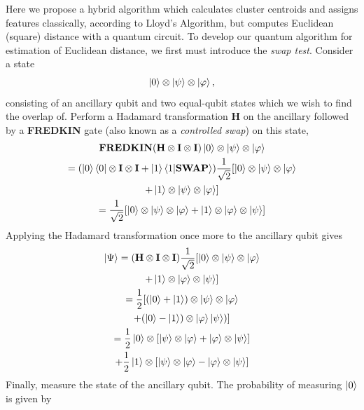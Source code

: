 \documentclass[twocolumn, english]{revtex4-2}
\begin{document}
Here we propose a hybrid algorithm which calculates cluster centroids and assigns features classically, according to Lloyd's Algorithm, but computes Euclidean (square) distance with a quantum circuit. To develop our quantum algorithm for estimation of Euclidean distance, we first must introduce the \textit{swap test}. Consider a state \begin{equation}\ket{0}\otimes\ket{\psi}\otimes\ket{\varphi},\end{equation} consisting of an ancillary qubit and two equal-qubit states which we wish to find the overlap of. Perform a Hadamard transformation \textbf{H} on the ancillary followed by a \textbf{FREDKIN} gate (also known as a \textit{controlled swap}) on this state, \begin{equation}\begin{gathered}
\textbf{FREDKIN}(\textbf{H}\otimes\textbf{I}\otimes\textbf{I})\ket{0}\otimes\ket{\psi}\otimes\ket{\varphi}\\
=(\ket{0}\bra{0}\otimes\textbf{I}\otimes\textbf{I}+\ket{1}\braket{1|\textbf{SWAP}})\frac{1}{\sqrt{2}}[\ket{0}\otimes\ket{\psi}\otimes\ket{\varphi}\\+\ket{1}\otimes\ket{\psi}\otimes\ket{\varphi}]\\
=\frac{1}{\sqrt{2}}[\ket{0}\otimes\ket{\psi}\otimes\ket{\varphi}+\ket{1}\otimes\ket{\varphi}\otimes\ket{\psi}]\end{gathered}\end{equation}
Applying the Hadamard transformation once more to the ancillary qubit gives
\begin{equation}\begin{gathered}
\ket{\Psi}=(\textbf{H}\otimes\textbf{I}\otimes\textbf{I})\frac{1}{\sqrt{2}}[\ket{0}\otimes\ket{\psi}\otimes\ket{\varphi}\\+\ket{1}\otimes\ket{\varphi}\otimes\ket{\psi}]\\
=\frac{1}{2}[(\ket{0}+\ket{1})\otimes\ket{\psi}\otimes\ket{\varphi}\\+(\ket{0}-\ket{1})\otimes\ket{\varphi}\ket{\psi})]\\
=\frac{1}{2}\ket{0}\otimes[\ket{\psi}\otimes\ket{\varphi}+\ket{\varphi}\otimes\ket{\psi}]\\+\frac{1}{2}\ket{1}\otimes[\ket{\psi}\otimes\ket{\varphi}-\ket{\varphi}\otimes\ket{\psi}]
\end{gathered}\end{equation}
Finally, measure the state of the ancillary qubit. The probability of measuring $\ket{0}$ is given by 
\end{document}
